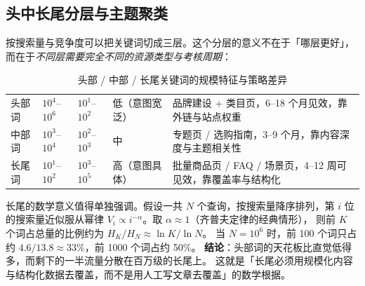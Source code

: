 \subsection{头中长尾分层与主题聚类}

按搜索量与竞争度可以把关键词切成三层。这个分层的意义不在于「哪层更好」，
而在于\emph{不同层需要完全不同的资源类型与考核周期}：

\begin{table}[htbp]
\centering
\caption{头部 / 中部 / 长尾关键词的规模特征与策略差异}
\label{tab:headtail}
\small
\begin{tabularx}{\textwidth}{L{1.7cm} L{2.1cm} L{2.1cm} L{2.4cm} Y}
\toprule
{} &  &  &  &  \\
\midrule
头部词 & $10^4$--$10^6$ & $10^1$--$10^2$ & 低（意图宽泛） & 品牌建设 + 类目页，6--18 个月见效，靠外链与站点权重 \\
中部词 & $10^3$--$10^4$ & $10^2$--$10^3$ & 中 & 专题页 / 选购指南，3--9 个月，靠内容深度与主题相关性 \\
长尾词 & $10^1$--$10^2$ & $10^3$--$10^5$ & 高（意图具体） & 批量商品页 / FAQ / 场景页，4--12 周可见效，靠覆盖率与结构化 \\
\bottomrule
\end{tabularx}
\end{table}

长尾的数学意义值得单独强调。假设一共 $N$ 个查询，按搜索量降序排列，第 $i$ 位的搜索量近似服从幂律
$V_i \propto i^{-\alpha}$。取 $\alpha \approx 1$（齐普夫定律的经典情形），
则前 $K$ 个词占总量的比例约为 $H_K / H_N \approx \ln K / \ln N$。
当 $N = 10^6$ 时，前 100 个词只占约 $4.6/13.8 \approx 33\%$，前 1000 个词占约 50\%。
\textbf{结论}：头部词的天花板比直觉低得多，而剩下的一半流量分散在百万级的长尾上。
这就是「长尾必须用规模化内容与结构化数据去覆盖，而不是用人工写文章去覆盖」的数学根据。

